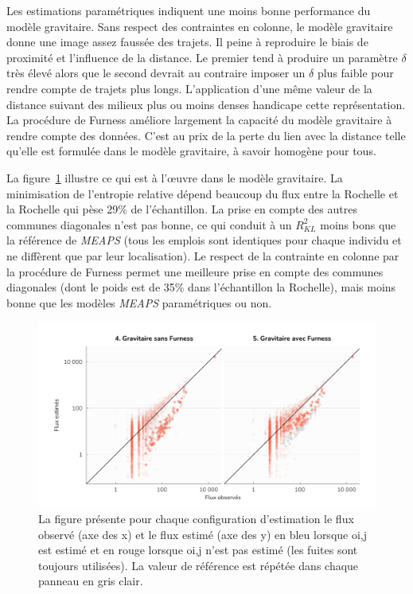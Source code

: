 \documentclass[
  10pt,
  a4paper,
  numbers=noendperiod,
  DIV=9]{scrreprt}
\begin{document}
Les estimations paramétriques indiquent une moins bonne performance du
modèle gravitaire. Sans respect des contraintes en colonne, le modèle
gravitaire donne une image assez faussée des trajets. Il peine à
reproduire le biais de proximité et l'influence de la distance. Le
premier tend à produire un paramètre \(\delta\) très élevé alors que le
second devrait au contraire imposer un \(\delta\) plus faible pour
rendre compte de trajets plus longs. L'application d'une même valeur de
la distance suivant des milieux plus ou moins denses handicape cette
représentation. La procédure de Furness améliore largement la capacité
du modèle gravitaire à rendre compte des données. C'est au prix de la
perte du lien avec la distance telle qu'elle est formulée dans le modèle
gravitaire, à savoir homogène pour tous.

La figure~\ref{fig-actvsfit-grav} illustre ce qui est à l'œuvre dans le
modèle gravitaire. La minimisation de l'entropie relative dépend
beaucoup du flux entre la Rochelle et la Rochelle qui pèse 29\% de
l'échantillon. La prise en compte des autres communes diagonales n'est
pas bonne, ce qui conduit à un \(R^2_{KL}\) moins bons que la référence
de \emph{MEAPS} (tous les emplois sont identiques pour chaque individu
et ne diffèrent que par leur localisation). Le respect de la contrainte
en colonne par la procédure de Furness permet une meilleure prise en
compte des communes diagonales (dont le poids est de 35\% dans
l'échantillon la Rochelle), mais moins bonne que les modèles
\emph{MEAPS} paramétriques ou non.

\begin{figure}[htb]

{\centering \includegraphics[width=1\textwidth,height=\textheight]{./larochelle_files/figure-pdf/fig-actvsfit-grav-1.png}

}

\caption[\emph{MEAPS} observés versus
estimés]{\label{fig-actvsfit-grav}La figure présente pour chaque
configuration d'estimation le flux observé (axe des x) et le flux estimé
(axe des y) en bleu lorsque oi,j est estimé et en rouge lorsque oi,j
n'est pas estimé (les fuites sont toujours utilisées). La valeur de
référence est répétée dans chaque panneau en gris clair.}

\end{figure}
\end{document}
